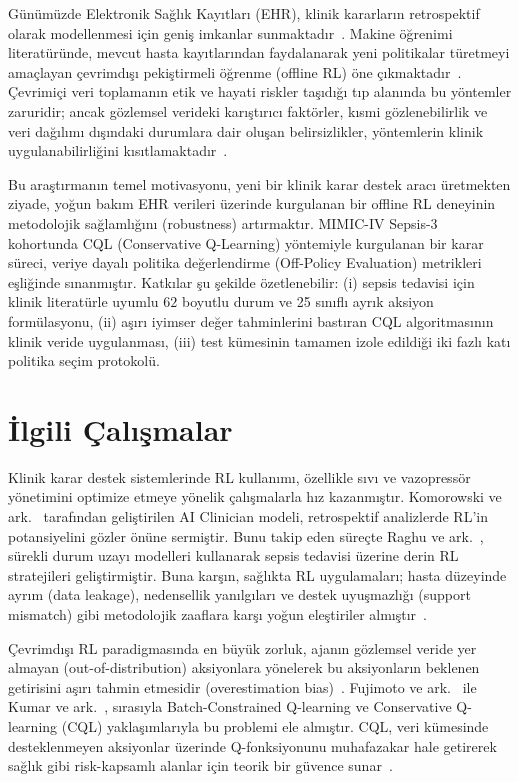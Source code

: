 \documentclass[11pt,a4paper]{article}
\begin{document}
Günümüzde Elektronik Sağlık Kayıtları (EHR), klinik kararların retrospektif olarak modellenmesi için geniş imkanlar sunmaktadır~\cite{johnson2023mimiciv,goldberger2000physionet}. Makine öğrenimi literatüründe, mevcut hasta kayıtlarından faydalanarak yeni politikalar türetmeyi amaçlayan çevrimdışı pekiştirmeli öğrenme (offline RL) öne çıkmaktadır~\cite{levine2020offline}. Çevrimiçi veri toplamanın etik ve hayati riskler taşıdığı tıp alanında bu yöntemler zaruridir; ancak gözlemsel verideki karıştırıcı faktörler, kısmi gözlenebilirlik ve veri dağılımı dışındaki durumlara dair oluşan belirsizlikler, yöntemlerin klinik uygulanabilirliğini kısıtlamaktadır~\cite{gottesman2019guidelines}.

Bu araştırmanın temel motivasyonu, yeni bir klinik karar destek aracı üretmekten ziyade, yoğun bakım EHR verileri üzerinde kurgulanan bir offline RL deneyinin metodolojik sağlamlığını (robustness) artırmaktır. MIMIC-IV Sepsis-3 kohortunda CQL (Conservative Q-Learning) yöntemiyle kurgulanan bir karar süreci, veriye dayalı politika değerlendirme (Off-Policy Evaluation) metrikleri eşliğinde sınanmıştır. Katkılar şu şekilde özetlenebilir: (i) sepsis tedavisi için klinik literatürle uyumlu $62$ boyutlu durum ve 25 sınıflı ayrık aksiyon formülasyonu, (ii) aşırı iyimser değer tahminlerini bastıran CQL algoritmasının klinik veride uygulanması, (iii) test kümesinin tamamen izole edildiği iki fazlı katı politika seçim protokolü.

\section{İlgili Çalışmalar}

Klinik karar destek sistemlerinde RL kullanımı, özellikle sıvı ve vazopressör yönetimini optimize etmeye yönelik çalışmalarla hız kazanmıştır. Komorowski ve ark.~\cite{komorowski2018ai} tarafından geliştirilen AI Clinician modeli, retrospektif analizlerde RL'in potansiyelini gözler önüne sermiştir. Bunu takip eden süreçte Raghu ve ark.~\cite{raghu2017continuous}, sürekli durum uzayı modelleri kullanarak sepsis tedavisi üzerine derin RL stratejileri geliştirmiştir. Buna karşın, sağlıkta RL uygulamaları; hasta düzeyinde ayrım (data leakage), nedensellik yanılgıları ve destek uyuşmazlığı (support mismatch) gibi metodolojik zaaflara karşı yoğun eleştiriler almıştır~\cite{gottesman2019guidelines,tang2026temporal}.

Çevrimdışı RL paradigmasında en büyük zorluk, ajanın gözlemsel veride yer almayan (out-of-distribution) aksiyonlara yönelerek bu aksiyonların beklenen getirisini aşırı tahmin etmesidir (overestimation bias)~\cite{levine2020offline}. Fujimoto ve ark.~\cite{fujimoto2019off} ile Kumar ve ark.~\cite{kumar2020cql}, sırasıyla Batch-Constrained Q-learning ve Conservative Q-learning (CQL) yaklaşımlarıyla bu problemi ele almıştır. CQL, veri kümesinde desteklenmeyen aksiyonlar üzerinde Q-fonksiyonunu muhafazakar hale getirerek sağlık gibi risk-kapsamlı alanlar için teorik bir güvence sunar~\cite{tang2021model}.
\end{document}
